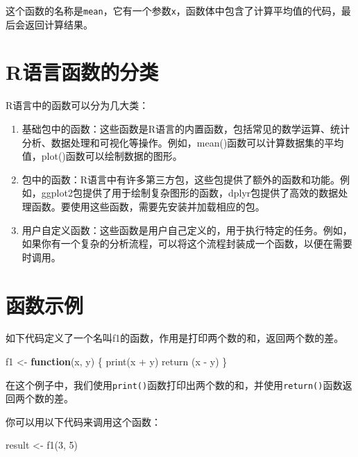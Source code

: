 \documentclass[
  letterpaper,
  DIV=11,
  numbers=noendperiod]{scrreprt}
\newenvironment{Shaded}{\begin{snugshade}}{\end{snugshade}}
\newcommand{\ControlFlowTok}[1]{\textcolor[rgb]{0.00,0.23,0.31}{\textbf{#1}}}
\newcommand{\DecValTok}[1]{\textcolor[rgb]{0.68,0.00,0.00}{#1}}
\newcommand{\FunctionTok}[1]{\textcolor[rgb]{0.28,0.35,0.67}{#1}}
\newcommand{\NormalTok}[1]{\textcolor[rgb]{0.00,0.23,0.31}{#1}}
\newcommand{\OtherTok}[1]{\textcolor[rgb]{0.00,0.23,0.31}{#1}}
\newcommand{\SpecialCharTok}[1]{\textcolor[rgb]{0.37,0.37,0.37}{#1}}
\begin{document}
这个函数的名称是\texttt{mean}，它有一个参数\texttt{x}，函数体中包含了计算平均值的代码，最后会返回计算结果。

\section{R语言函数的分类}\label{rux8bedux8a00ux51fdux6570ux7684ux5206ux7c7b}

R语言中的函数可以分为几大类：

\begin{enumerate}
\def\labelenumi{\arabic{enumi}.}
\item
  基础包中的函数：这些函数是R语言的内置函数，包括常见的数学运算、统计分析、数据处理和可视化等操作。例如，mean()函数可以计算数据集的平均值，plot()函数可以绘制数据的图形。
\item
  包中的函数：R语言中有许多第三方包，这些包提供了额外的函数和功能。例如，ggplot2包提供了用于绘制复杂图形的函数，dplyr包提供了高效的数据处理函数。要使用这些函数，需要先安装并加载相应的包。
\item
  用户自定义函数：这些函数是用户自己定义的，用于执行特定的任务。例如，如果你有一个复杂的分析流程，可以将这个流程封装成一个函数，以便在需要时调用。
\end{enumerate}

\section{函数示例}\label{ux51fdux6570ux793aux4f8b}

如下代码定义了一个名叫f1的函数，作用是打印两个数的和，返回两个数的差。

\begin{Shaded}
\begin{Highlighting}[]
\NormalTok{f1 }\OtherTok{\textless{}{-}} \ControlFlowTok{function}\NormalTok{(x, y) \{}
  \FunctionTok{print}\NormalTok{(x }\SpecialCharTok{+}\NormalTok{ y)}
  \FunctionTok{return}\NormalTok{ (x }\SpecialCharTok{{-}}\NormalTok{ y)}
\NormalTok{\}}
\end{Highlighting}
\end{Shaded}

在这个例子中，我们使用\texttt{print()}函数打印出两个数的和，并使用\texttt{return()}函数返回两个数的差。

你可以用以下代码来调用这个函数：

\begin{Shaded}
\begin{Highlighting}[]
\NormalTok{result }\OtherTok{\textless{}{-}} \FunctionTok{f1}\NormalTok{(}\DecValTok{3}\NormalTok{, }\DecValTok{5}\NormalTok{)}
\end{Highlighting}
\end{Shaded}
\end{document}
